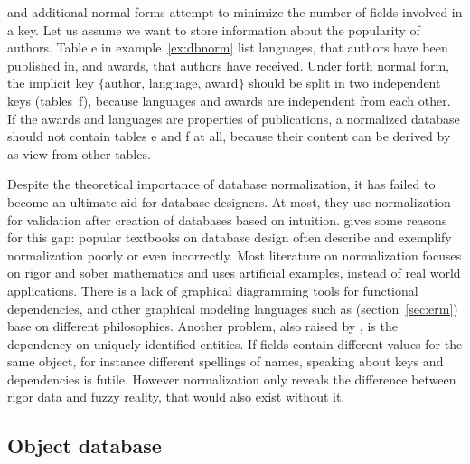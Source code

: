  and additional normal forms attempt to minimize the number of fields
involved in a key. Let us assume we want to store information about the popularity
of authors. Table {\ormtext e} in example~\ref{ex:dbnorm} list languages, that
authors have been published in, and awards, that authors have received. Under
forth normal form, the implicit key $\{${\ormtext author}, {\ormtext language}, 
{\ormtext award}$\}$ should be split in two independent keys (tables~{\ormtext f}),
because languages and awards are independent from each other. If the awards and
languages are properties of publications, a normalized database should not
contain tables {\ormtext e} and {\ormtext f} at all, because their content can
be derived by  as view from other tables.

Despite the theoretical importance of database normalization, it has failed to
become an ultimate aid for database designers. At most, they use normalization
for validation after creation of databases based on intuition.
\textcite{Fotache2006} gives some reasons for this gap: popular textbooks on
database design often describe and exemplify normalization poorly or even
incorrectly. Most literature on normalization focuses on rigor and sober
mathematics and uses artificial examples, instead of real world applications.
There is a lack of graphical diagramming tools for functional dependencies, and
other graphical modeling languages such as  (section~\ref{sec:erm})
base on different philosophies. Another problem, also raised by
\textcite{Kent1983}, is the dependency on uniquely identified entities. If
fields contain different values for the same object, for instance different
spellings of names, speaking about keys and dependencies is futile. However
normalization only reveals the difference between rigor data and fuzzy reality,
that would also exist without it.




\subsection{Object database}
\label{sec:oodbms}

